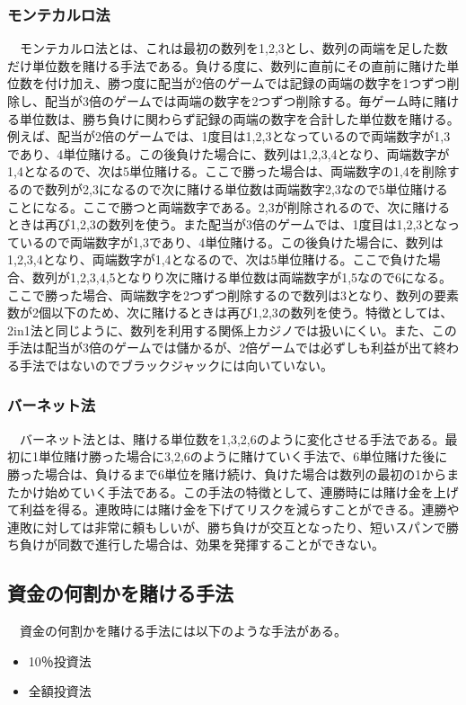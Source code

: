 \subsubsection{モンテカルロ法}  
　モンテカルロ法とは、これは最初の数列を{1,2,3}とし、数列の両端を足した数だけ単位数を賭ける手法である。負ける度に、数列に直前にその直前に賭けた単位数を付け加え、勝つ度に配当が2倍のゲームでは記録の両端の数字を1つずつ削除し、配当が3倍のゲームでは両端の数字を2つずつ削除する。毎ゲーム時に賭ける単位数は、勝ち負けに関わらず記録の両端の数字を合計した単位数を賭ける。例えば、配当が2倍のゲームでは、1度目は{1,2,3}となっているので両端数字が1,3であり、4単位賭ける。この後負けた場合に、数列は{1,2,3,4}となり、両端数字が1,4となるので、次は5単位賭ける。ここで勝った場合は、両端数字の1,4を削除するので数列が{2,3}になるので次に賭ける単位数は両端数字2,3なので5単位賭けることになる。ここで勝つと両端数字である。2,3が削除されるので、次に賭けるときは再び{1,2,3}の数列を使う。また配当が3倍のゲームでは、1度目は{1,2,3}となっているので両端数字が1,3であり、4単位賭ける。この後負けた場合に、数列は{1,2,3,4}となり、両端数字が1,4となるので、次は5単位賭ける。ここで負けた場合、数列が{1,2,3,4,5}となりり次に賭ける単位数は両端数字が{1,5}なので6になる。ここで勝った場合、両端数字を2つずつ削除するので数列は{3}となり、数列の要素数が2個以下のため、次に賭けるときは再び{1,2,3}の数列を使う。特徴としては、2in1法と同じように、数列を利用する関係上カジノでは扱いにくい。また、この手法は配当が3倍のゲームでは儲かるが、2倍ゲームでは必ずしも利益が出て終わる手法ではないのでブラックジャックには向いていない。
\subsubsection{バーネット法}  
　バーネット法とは、賭ける単位数を1,3,2,6のように変化させる手法である。最初に1単位賭け勝った場合に3,2,6のように賭けていく手法で、6単位賭けた後に勝った場合は、負けるまで6単位を賭け続け、負けた場合は数列の最初の1からまたかけ始めていく手法である。この手法の特徴として、連勝時には賭け金を上げて利益を得る。連敗時には賭け金を下げてリスクを減らすことができる。連勝や連敗に対しては非常に頼もしいが、勝ち負けが交互となったり、短いスパンで勝ち負けが同数で進行した場合は、効果を発揮することができない。

\subsection{資金の何割かを賭ける手法}
　資金の何割かを賭ける手法には以下のような手法がある。
  \begin{itemize}
 \item 10％投資法
 \item 全額投資法
 \end{itemize}
